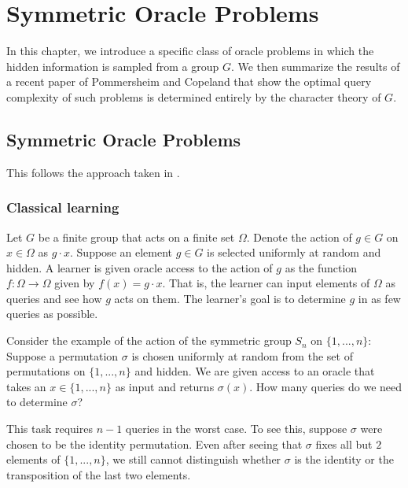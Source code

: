
\chapter{Symmetric Oracle Problems}



In this chapter, we introduce a specific class of oracle problems in which the hidden information is sampled from a 
group $G$. We then summarize the results of a recent paper \cite{jamie} of Pommersheim and Copeland that show the 
optimal query complexity of such problems is determined entirely by the character theory of $G$. 





\section{Symmetric Oracle Problems}
This follows the approach taken in \cite{jamie}.


\subsection{Classical learning}

Let $G$ be a finite group that acts on a finite set $\Omega$. Denote the action of $g \in G$ on $x \in \Omega$ as 
$g \cdot x$. Suppose an element $g \in G$ is selected uniformly at random and hidden. A learner is given oracle 
access to the action of $g$ as the function $f : \Omega \rightarrow \Omega$ given by $f(x) = g \cdot x$. That is, 
the learner can input elements of $\Omega$ as queries and see how $g$ acts on them. The learner's goal is to 
determine $g$ in as few queries as possible.

\begin{example}
    Consider the example of the action of the symmetric group $S_n$ on $\{1, ..., n\}$:
    Suppose a permutation $\sigma$ is chosen uniformly at random from the set of permutations on $\{1, ..., n\}$ 
    and hidden. We are given access to an oracle that takes an $x \in \{1,...,n\}$ as input and returns 
    $\sigma(x)$. How many queries do we need to determine $\sigma$?
\end{example}

This task requires $n-1$ queries in the worst case. To see this, suppose $\sigma$ were chosen to be the identity 
permutation.  Even after seeing that $\sigma$ fixes all but $2$ elements of $\{1,...,n\}$, we still cannot 
distinguish whether $\sigma$ is the identity or the transposition of the last two elements.



